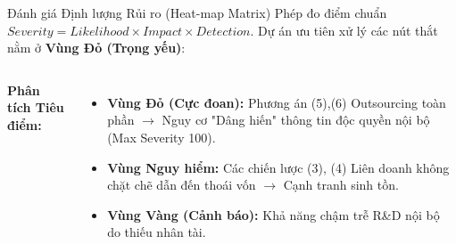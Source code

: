 \documentclass[10pt, aspectratio=169]{beamer}
\begin{document}
\begin{frame}{Đánh giá Định lượng Rủi ro (Heat-map Matrix)}
    Phép đo điểm chuẩn $Severity = Likelihood \times Impact \times Detection$. Dự án ưu tiên xử lý các nút thắt nằm ở \textbf{Vùng Đỏ (Trọng yếu)}:
    \vspace{0.3cm}
    
    \begin{columns}[c]
        \renewcommand{\arraystretch}{1.5}
        
        \textbf{Phân tích Tiêu điểm:}
        \begin{itemize}
            \item \textbf{\textcolor{heatred}{Vùng Đỏ (Cực đoan):}} Phương án (5),(6) Outsourcing toàn phần $\rightarrow$ Nguy cơ "Dâng hiến" thông tin độc quyền nội bộ (Max Severity 100).
            \item \textbf{\textcolor{heatred}{Vùng Nguy hiểm:}} Các chiến lược (3), (4) Liên doanh không chặt chẽ dẫn đến thoái vốn $\rightarrow$ Cạnh tranh sinh tồn.
            \item \textbf{\textcolor{heatyellow}{Vùng Vàng (Cảnh báo):}} Khả năng chậm trễ R\&D nội bộ do thiếu nhân tài.
        \end{itemize}
    \end{columns}
\end{frame}
\end{document}
